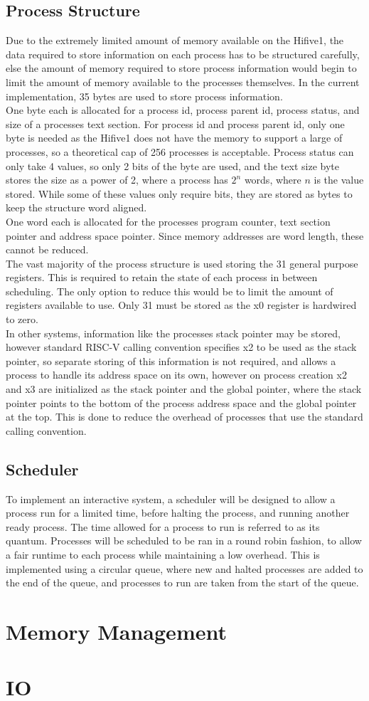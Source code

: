 \subsection{Process Structure}
Due to the extremely limited amount of memory available on the Hifive1, the data required to store information on each process has to be structured carefully, else the amount of memory required to store process information would begin to limit the amount of memory available to the processes themselves. In the current implementation, 35 bytes are used to store process information.
\\
One byte each is allocated for a process id, process parent id, process status, and size of a processes text section. For process id and process parent id, only one byte is needed as the Hifive1 does not have the memory to support a large of processes, so a theoretical cap of 256 processes is acceptable. Process status can only take 4 values, so only 2 bits of the byte are used, and the text size byte stores the size as a power of 2, where a process has \(2^n\) words, where \(n\) is the value stored. While some of these values only require bits, they are stored as bytes to keep the structure word aligned. 
\\
One word each is allocated for the processes program counter, text section pointer and address space pointer. Since memory addresses are word length, these cannot be reduced.
\\
The vast majority of the process structure is used storing the 31 general purpose registers. This is required to retain the state of each process in between scheduling. The only option to reduce this would be to limit the amount of registers available to use. Only 31 must be stored as the x0 register is hardwired to zero.
\\
In other systems, information like the processes stack pointer may be stored, however standard RISC-V calling convention specifies x2 to be used as the stack pointer, so separate storing of this information is not required, and allows a process to handle its address space on its own, however on process creation x2 and x3 are initialized as the stack pointer and the global pointer, where the stack pointer points to the bottom of the process address space and the global pointer at the top. This is done to reduce the overhead of processes that use the standard calling convention.
\subsection{Scheduler}
To implement an interactive system, a scheduler will be designed to allow a process run for a limited time, before halting the process, and running another ready process. The time allowed for a process to run is referred to as its quantum. Processes will be scheduled to be ran in a round robin fashion, to allow a fair runtime to each process while maintaining a low overhead. This is implemented using a circular queue, where new and halted processes are added to the end of the queue, and processes to run are taken from the start of the queue.
\section{Memory Management}

\section{IO}